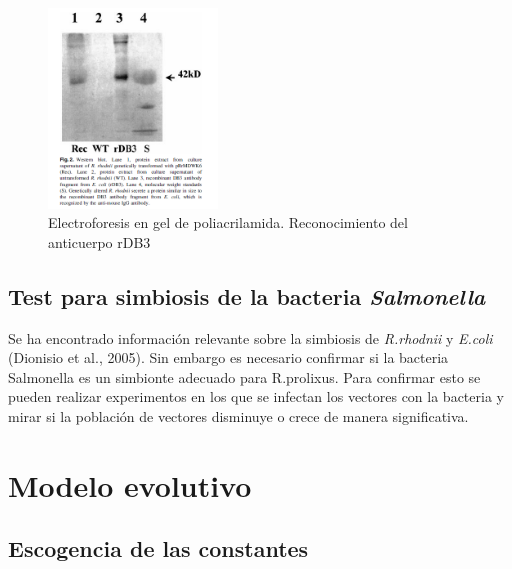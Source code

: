\documentclass[12pt]{article}
\numberwithin{equation}{section}
\begin{document}
\begin{figure}[!ht]
\includegraphics[width=0.4\textwidth]{electrof.PNG}
\caption{Electroforesis en gel de poliacrilamida. Reconocimiento del anticuerpo rDB3}
\FloatBarrier
\end{figure}


\subsection{Test para simbiosis de la bacteria \textit{Salmonella}}
Se ha encontrado información relevante sobre la simbiosis de \textit{R.rhodnii} y \textit{E.coli} (Dionisio et al., 2005). Sin embargo es necesario confirmar si la bacteria Salmonella es un simbionte adecuado para R.prolixus. Para confirmar esto se pueden realizar experimentos en los que se infectan los vectores con la bacteria y mirar si la población de vectores disminuye o crece de manera significativa.


\section{Modelo evolutivo}
\subsection{Escogencia de las constantes}
\end{document}
